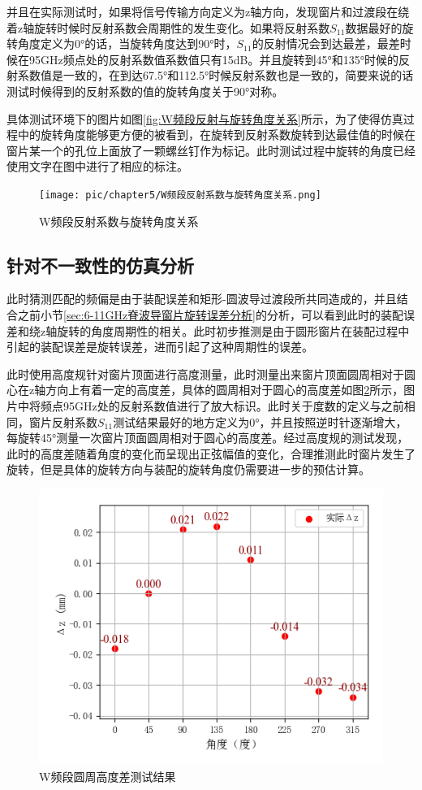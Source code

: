 \documentclass[master]{thesis-uestc}
\begin{document}
并且在实际测试时，如果将信号传输方向定义为z轴方向，发现窗片和过渡段在绕着z轴旋转时候时反射系数会周期性的发生变化。如果将反射系数$S_{11}$数据最好的旋转角度定义为0°的话，当旋转角度达到90°时，$S_{11}$的反射情况会到达最差，最差时候在95GHz频点处的反射系数值系数值只有15dB。并且旋转到45°和135°时候的反射系数值是一致的，在到达67.5°和112.5°时候反射系数也是一致的，简要来说的话测试时候得到的反射系数的值的旋转角度关于90°对称。

具体测试环境下的图片如图\ref{fig:W频段反射与旋转角度关系}所示，为了使得仿真过程中的旋转角度能够更方便的被看到，在旋转到反射系数旋转到达最佳值的时候在窗片某一个的孔位上面放了一颗螺丝钉作为标记。此时测试过程中旋转的角度已经使用文字在图中进行了相应的标注。
\begin{figure}[!htb]
    \centering
    \texttt{[image: pic/chapter5/W频段反射系数与旋转角度关系.png]}
    \caption{W频段反射系数与旋转角度关系}
    \label{fig:W频段反射系数与旋转角度关系}
\end{figure}

\subsection{针对不一致性的仿真分析}
此时猜测匹配的频偏是由于装配误差和矩形-圆波导过渡段所共同造成的，并且结合之前小节\ref{sec:6-11GHz脊波导窗片旋转误差分析}的分析，可以看到此时的装配误差和绕z轴旋转的角度周期性的相关。此时初步推测是由于圆形窗片在装配过程中引起的装配误差是旋转误差，进而引起了这种周期性的误差。

此时使用高度规针对窗片顶面进行高度测量，此时测量出来窗片顶面圆周相对于圆心在z轴方向上有着一定的高度差，具体的圆周相对于圆心的高度差如图\ref{fig:W频段圆周高度差测试结果}所示，图片中将频点95GHz处的反射系数值进行了放大标识。此时关于度数的定义与之前相同，窗片反射系数$S_{11}$测试结果最好的地方定义为0°，并且按照逆时针逐渐增大，每旋转45°测量一次窗片顶面圆周相对于圆心的高度差。经过高度规的测试发现，此时的高度差随着角度的变化而呈现出正弦幅值的变化，合理推测此时窗片发生了旋转，但是具体的旋转方向与装配的旋转角度仍需要进一步的预估计算。
\begin{figure}[!htb]
    \centering
    \includegraphics[width=0.5\linewidth]{pic/chapter5/可视化高度差.png}
    \caption{W频段圆周高度差测试结果}
    \label{fig:W频段圆周高度差测试结果}
\end{figure}
\end{document}
